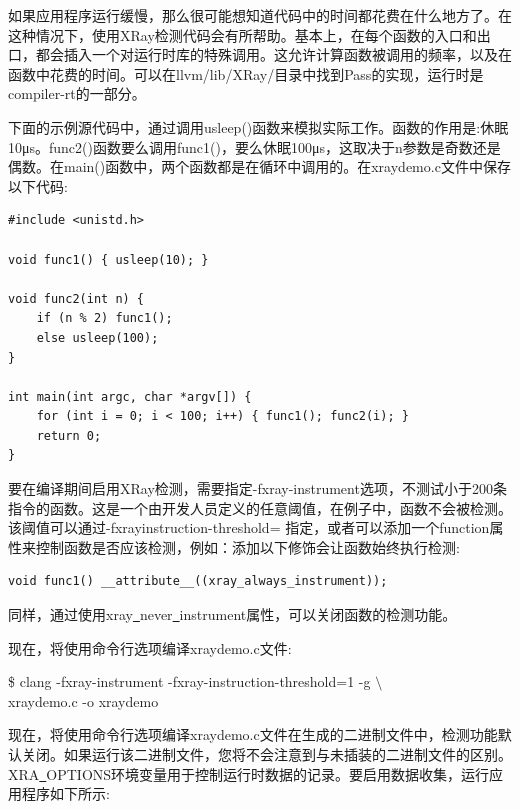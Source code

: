 
如果应用程序运行缓慢，那么很可能想知道代码中的时间都花费在什么地方了。在这种情况下，使用XRay检测代码会有所帮助。基本上，在每个函数的入口和出口，都会插入一个对运行时库的特殊调用。这允许计算函数被调用的频率，以及在函数中花费的时间。可以在llvm/lib/XRay/目录中找到Pass的实现，运行时是compiler-rt的一部分。\par

下面的示例源代码中，通过调用usleep()函数来模拟实际工作。函数的作用是:休眠10μs。func2()函数要么调用func1()，要么休眠100μs，这取决于n参数是奇数还是偶数。在main()函数中，两个函数都是在循环中调用的。在xraydemo.c文件中保存以下代码:\par

\begin{lstlisting}[caption={}]
#include <unistd.h>

void func1() { usleep(10); }

void func2(int n) {
	if (n % 2) func1();
	else usleep(100);
}

int main(int argc, char *argv[]) {
	for (int i = 0; i < 100; i++) { func1(); func2(i); }
	return 0;
}
\end{lstlisting}

要在编译期间启用XRay检测，需要指定-fxray-instrument选项，不测试小于200条指令的函数。这是一个由开发人员定义的任意阈值，在例子中，函数不会被检测。该阈值可以通过-fxrayinstruction-threshold= 指定，或者可以添加一个function属性来控制函数是否应该检测，例如：添加以下修饰会让函数始终执行检测:\par

\begin{lstlisting}[caption={}]
void func1() __attribute__((xray_always_instrument));
\end{lstlisting}

同样，通过使用xray\underline{~}never\underline{~}instrument属性，可以关闭函数的检测功能。\par

现在，将使用命令行选项编译xraydemo.c文件:

\begin{tcolorbox}[colback=white,colframe=black]
\$ clang -fxray-instrument -fxray-instruction-threshold=1 -g $\setminus$ \\
\hspace*{1cm}xraydemo.c -o xraydemo
\end{tcolorbox}

现在，将使用命令行选项编译xraydemo.c文件在生成的二进制文件中，检测功能默认关闭。如果运行该二进制文件，您将不会注意到与未插装的二进制文件的区别。XRA\underline{~}OPTIONS环境变量用于控制运行时数据的记录。要启用数据收集，运行应用程序如下所示:\par

